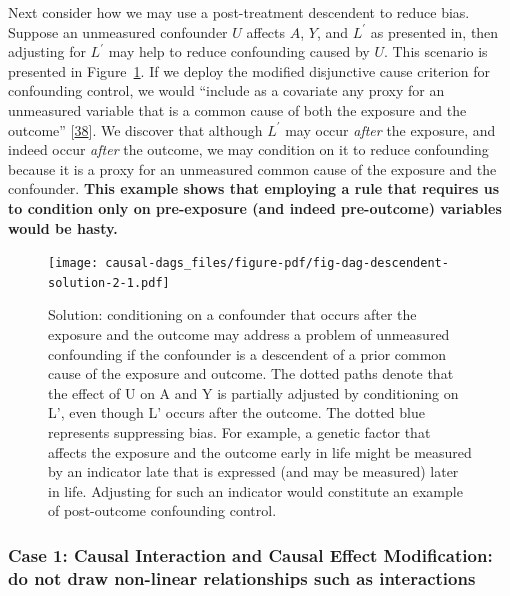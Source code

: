 \documentclass[
  singlecolumn]{article}
\begin{document}
Next consider how we may use a post-treatment descendent to reduce bias.
Suppose an unmeasured confounder \(U\) affects \(A\), \(Y\), and
\(L^\prime\) as presented in, then adjusting for \(L^\prime\) may help
to reduce confounding caused by \(U\). This scenario is presented in
Figure~\ref{fig-dag-descendent-solution-2}. If we deploy the modified
disjunctive cause criterion for confounding control, we would ``include
as a covariate any proxy for an unmeasured variable that is a common
cause of both the exposure and the outcome''
{[}\protect\hyperlink{ref-vanderweele2019}{38}{]}. We discover that
although \(L^\prime\) may occur \emph{after} the exposure, and indeed
occur \emph{after} the outcome, we may condition on it to reduce
confounding because it is a proxy for an unmeasured common cause of the
exposure and the confounder. \textbf{This example shows that employing a
rule that requires us to condition only on pre-exposure (and indeed
pre-outcome) variables would be hasty.}

\begin{figure}

{\centering \texttt{[image: causal-dags\_files/figure-pdf/fig-dag-descendent-solution-2-1.pdf]}

}

\caption{\label{fig-dag-descendent-solution-2}Solution: conditioning on
a confounder that occurs after the exposure and the outcome may address
a problem of unmeasured confounding if the confounder is a descendent of
a prior common cause of the exposure and outcome. The dotted paths
denote that the effect of U on A and Y is partially adjusted by
conditioning on L', even though L' occurs after the outcome. The dotted
blue represents suppressing bias. For example, a genetic factor that
affects the exposure and the outcome early in life might be measured by
an indicator late that is expressed (and may be measured) later in life.
Adjusting for such an indicator would constitute an example of
post-outcome confounding control.}

\end{figure}

\hypertarget{case-1-causal-interaction-and-causal-effect-modification-do-not-draw-non-linear-relationships-such-as-interactions}{%
\subsubsection{Case 1: Causal Interaction and Causal Effect
Modification: do not draw non-linear relationships such as
interactions}\label{case-1-causal-interaction-and-causal-effect-modification-do-not-draw-non-linear-relationships-such-as-interactions}}
\end{document}

